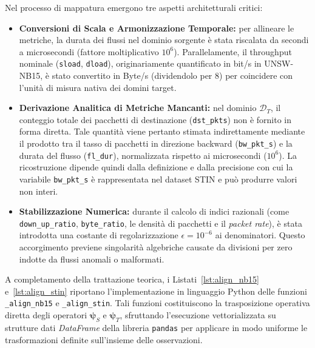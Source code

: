 Nel processo di mappatura emergono tre aspetti architetturali critici:
\begin{itemize}
    \item \textbf{Conversioni di Scala e Armonizzazione Temporale:} per allineare le metriche, la durata dei flussi nel dominio sorgente è stata riscalata da secondi a microsecondi (fattore moltiplicativo $10^6$). Parallelamente, il throughput nominale (\texttt{sload}, \texttt{dload}), originariamente quantificato in bit/s in UNSW-NB15, è stato convertito in Byte/s (dividendolo per 8) per coincidere con l'unità di misura nativa dei domini target.
    \item \textbf{Derivazione Analitica di Metriche Mancanti:} nel dominio $\mathcal{D}_T$, il conteggio totale dei pacchetti di destinazione (\texttt{dst\_pkts}) non è fornito in forma diretta. Tale quantità viene pertanto stimata indirettamente mediante il prodotto tra il tasso di pacchetti in direzione backward (\texttt{bw\_pkt\_s}) e la durata del flusso (\texttt{fl\_dur}), normalizzata rispetto ai microsecondi ($10^6$). La ricostruzione dipende quindi dalla definizione e dalla precisione con cui la variabile \texttt{bw\_pkt\_s} è rappresentata nel dataset STIN e può produrre valori non interi.
    \item \textbf{Stabilizzazione Numerica:} durante il calcolo di indici razionali (come \texttt{down\_up\_ratio}, \texttt{byte\_ratio}, le densità di pacchetti e il \textit{packet rate}), è stata introdotta una costante di regolarizzazione $\epsilon = 10^{-6}$ ai denominatori. Questo accorgimento previene singolarità algebriche causate da divisioni per zero indotte da flussi anomali o malformati.
\end{itemize}

A completamento della trattazione teorica, i Listati~\ref{lst:align_nb15} e~\ref{lst:align_stin} riportano l'implementazione in linguaggio Python delle funzioni \texttt{\_align\_nb15} e \texttt{\_align\_stin}.
Tali funzioni costituiscono la trasposizione operativa diretta degli operatori $\boldsymbol{\psi}_S$ e $\boldsymbol{\psi}_T$, sfruttando l'esecuzione vettorializzata su strutture dati \textit{DataFrame} della libreria \texttt{pandas} per applicare in modo uniforme le trasformazioni definite sull'insieme delle osservazioni.

\newpage

